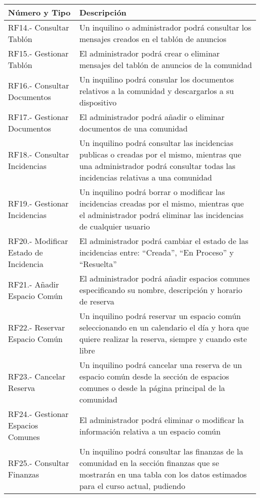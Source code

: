 \begin{appendices}
\begin{table}[H]
	\begin{center}
		\bgroup
		\def\arraystretch{1.5}
		\begin{tabular}{| p{5cm} | p{10cm} |}
			\hline
			\textbf{Número y Tipo} & \textbf{Descripción}  \\ \hline
			RF14.- Consultar Tablón & Un inquilino o administrador podrá consultar los mensajes creados en
			el tablón de anuncios \\ \hline
			RF15.- Gestionar Tablón & El administrador podrá crear o eliminar mensajes del tablón de anuncios de la comunidad \\ \hline
			RF16.- Consultar Documentos &  Un inquilino podrá consular los documentos relativos a la comunidad y descargarlos a su dispositivo\\ \hline
			RF17.- Gestionar Documentos & El administrador podrá añadir o eliminar documentos de una comunidad \\ \hline
			RF18.- Consultar Incidencias &  Un inquilino podrá consultar las incidencias publicas o creadas por
			el mismo, mientras que una administrador podrá consultar todas las incidencias relativas a una
			comunidad \\ \hline
			RF19.- Gestionar Incidencias & Un inquilino podrá borrar o modificar las incidencias creadas por
			el mismo, mientras que el administrador podrá eliminar las incidencias de cualquier usuario \\ \hline
			RF20.- Modificar Estado de Incidencia &  El administrador podrá cambiar el estado de las incidencias entre: “Creada”, “En Proceso” y “Resuelta”\\ \hline
			RF21.- Añadir Espacio Común & El administrador podrá añadir espacios comunes especificando
			su nombre, descripción y horario de reserva \\ \hline
			RF22.- Reservar Espacio Común & Un inquilino podrá reservar un espacio común seleccionando
			en un calendario el día y hora que quiere realizar la reserva, siempre y cuando este libre \\ \hline
			RF23.- Cancelar Reserva & Un inquilino podrá cancelar una reserva de un espacio común desde la
			sección de espacios comunes o desde la página principal de la comunidad  \\ \hline
			RF24.- Gestionar Espacios Comunes &  El administrador podrá eliminar o modificar la información relativa a un espacio común \\ \hline
			RF25.- Consultar Finanzas & Un inquilino podrá consultar las finanzas de la comunidad en la sección finanzas que se mostrarán en una tabla con los datos estimados para el curso actual, pudiendo

\end{tabular}
\end{center}
\end{table}
\end{appendices}
